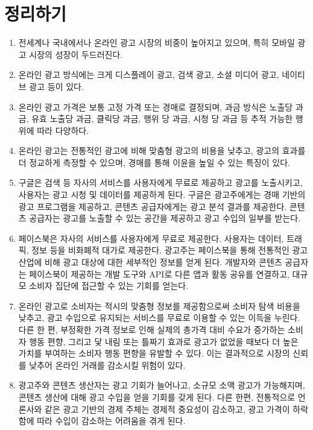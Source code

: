 \section*{정리하기}
\begin{enumerate}
\item 전세계나 국내에서나 온라인 광고 시장의 비중이 높아지고 있으며, 특히 모바일 광고 시장의 성장이 두드러진다.
\item 온라인 광고 방식에는 크게 디스플레이 광고, 검색 광고, 소셜 미디어 광고, 네이티브 광고 등이 있다.
\item 온라인 광고 가격은 보통 고정 가격 또는 경매로 결정되며, 과금 방식은 노출당 과금, 유효 노출당 과금, 클릭당 과금, 행위 당 과금, 시청 당 과금 등 추적 가능한 행위에 따라 다양하다.
\item 온라인 광고는 전통적인 광고에 비해 맞춤형 광고의 비용을 낮추고, 광고의 효과를 더 정교하게 측정할 수 있으며, 경매를 통해 이윤을 높일 수 있는 특징이 있다.
\item 구글은 검색 등 자사의 서비스를 사용자에게 무료로 제공하고 광고를 노출시키고, 사용자는 광고 시청 및 데이터를 제공하게 된다. 구글은 광고주에게는 경매 기반의 광고 프로그램을 제공하고, 콘텐츠 공급자에게는 광고 분석 결과를 제공한다. 콘텐츠 공급자는 광고를 노출할 수 있는 공간을 제공하고 광고 수입의 일부를 받는다.
\item 페이스북은 자사의 서비스를 사용자에게 무료로 제공한다. 사용자는 데이터, 트래픽, 정보 등을 비화폐적 대가로 제공한다. 광고주는 페이스북을 통해 전통적인 광고 산업에 비해 광고 대상에 대한 세부적인 정보를 얻게 된다. 개발자와 콘텐츠 공급자는 페이스북이 제공하는 개발 도구와 API로 다른 앱과 활동 공유를 연결하고, 대규모 소비자 집단에 접근할 수 있는 기회를 얻는다.
\item 온라인 광고로 소비자는 적시의 맞춤형 정보를 제공함으로써 소비자 탐색 비용을 낮추고, 광고 수입으로 유지되는 서비스를 무료로 이용할 수 있는 이득을 누린다. 다른 한 편, 부정확한 가격 정보로 인해 실제의 총가격 대비 수요가 증가하는 소비자 행동 편향, 그리고 닻 내림 또는 틀짜기 효과로 광고가 없었을 때보다 더 높은 가치를 부여하는 소비자 행동 편향을 유발할 수 있다. 이는 결과적으로 시장의 신뢰를 낮추어 온라인 거래를 감소시킬 위험이 있다.
\item 광고주와 콘텐츠 생산자는 광고 기회가 늘어나고, 소규모 소액 광고가 가능해지며, 콘텐츠 생산에 대해 광고 수입을 얻을 기회를 갖게 된다. 다른 한편, 전통적으로 언론사와 같은 광고 기반의 경제 주체는 경제적 중요성이 감소하고, 광고 가격이 하락함에 따라 수입이 감소하는 어려움을 겪게 된다.
\end{enumerate}